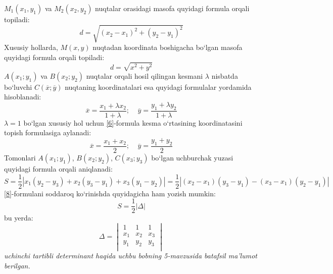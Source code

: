 $M_{1}(x_{1},y_{1})$ va $M_{2}(x_{2},y_{2})$ nuqtalar orasidagi masofa quyidagi formula orqali topiladi:
\begin{equation}
	d=\sqrt{(x_{2}-x_{1})^{2}+(y_{2}-y_{1})^{2}}
	\label{4}
\end{equation}
Xususiy hollarda, $M(x,y)$ nuqtadan koordinata boshigacha bo`lgan masofa quyidagi formula orqali topiladi:
\begin{equation}
	d=\sqrt{x^{2}+y^{2}}
	\label{5}
\end{equation}
$A(x_{1};y_{1})$ va $B(x_{2};y_{2})$ nuqtalar orqali hosil qilingan kesmani $\lambda$ nisbatda bo`luvchi $C(\overline{x};\overline{y})$ nuqtaning koordinatalari esa quyidagi formulalar yordamida hisoblanadi:
\begin{equation}
	\overline{x}=\frac{x_{1}+\lambda x_{2}}{1+\lambda};\ \ \ \ \ \overline{y}=\frac{y_{1}+\lambda y_{2}}{1+\lambda}
	\label{6}
\end{equation}
$\lambda=1$ bo`lgan xususiy hol uchun \eqref{6}-formula kesma o`rtasining koordinatasini topish formulasiga aylanadi:
\begin{equation}
	\overline{x}=\frac{x_{1}+x_{2}}{2};\ \ \ \ \ \overline{y}=\frac{y_{1}+y_{2}}{2}
	\label{7}
\end{equation}
Tomonlari $A(x_{1};y_{1})$, $B(x_{2};y_{2})$, $C(x_{3};y_{3})$ bo`lgan uchburchak yuzasi quyidagi formula orqali aniqlanadi:
\begin{equation}
	S=\frac{1}{2}\left| x_{1}(y_{2}-y_{3})+x_{2}(y_{3}-y_{1})+x_{3}(y_{1}-y_{2})\right|=
	\frac{1}{2}\left|(x_{2}-x_{1})(y_{3}-y_{1})-(x_{3}-x_{1})(y_{2}-y_{1})
	\right|
	\label{8}
\end{equation}
\eqref{8}-formulani soddaroq ko`rinishda quyidagicha ham yozish mumkin:
\begin{equation}
	S=\frac{1}{2}|\Delta|
	\label{9}
\end{equation}
bu yerda:
\begin{equation}
	\Delta=
	\begin{vmatrix}
		1&1&1\\
		x_{1}&x_{2}&x_{3}\\
		y_{1}&y_{2}&y_{3}\\
	\end{vmatrix}
\end{equation}\textit{uchinchi tartibli determinant haqida uchbu bobning 5-mavzusida batafsil ma'lumot berilgan.}

